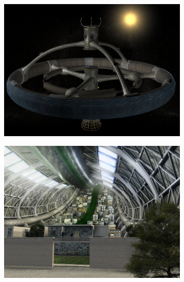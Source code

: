 \documentclass[11pt,a4paper]{article}
\begin{document}
\begin{figure}[H]
 \begin{subfigure}{0.47\textwidth}
 \centering
  \includegraphics[width=\textwidth]{images/station02}
 \end{subfigure}
 \begin{subfigure}{0.47\textwidth}
 \centering
  \includegraphics[width=\textwidth]{images/interior-final-nocharacters}
 \end{subfigure}
 

\end{figure}
\end{document}
